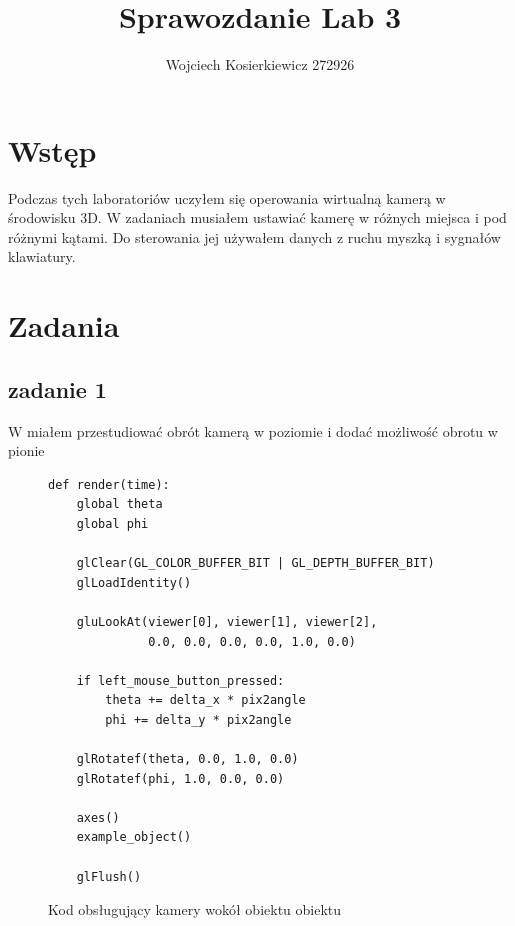 \documentclass[]{article}
\title{Sprawozdanie Lab 3}
\author{Wojciech Kosierkiewicz 272926}
\begin{document}
	\maketitle
	\newpage
	
\section{Wstęp}
Podczas tych laboratoriów uczyłem się operowania wirtualną kamerą w środowisku 3D. W zadaniach musiałem ustawiać kamerę w różnych miejsca i pod różnymi kątami. Do sterowania jej używałem danych z ruchu myszką i sygnałów klawiatury.
\section{Zadania}
\subsection{zadanie 1}
W miałem przestudiować obrót kamerą w poziomie i dodać możliwość obrotu w pionie
\begin{figure}[H]
	\begin{verbatim}
def render(time):
    global theta
    global phi

    glClear(GL_COLOR_BUFFER_BIT | GL_DEPTH_BUFFER_BIT)
    glLoadIdentity()

    gluLookAt(viewer[0], viewer[1], viewer[2],
              0.0, 0.0, 0.0, 0.0, 1.0, 0.0)

    if left_mouse_button_pressed:
        theta += delta_x * pix2angle
        phi += delta_y * pix2angle

    glRotatef(theta, 0.0, 1.0, 0.0)
    glRotatef(phi, 1.0, 0.0, 0.0)

    axes()
    example_object()

    glFlush()
\end{verbatim}
\caption{Kod obsługujący kamery wokół obiektu obiektu}
\end{figure}
\end{document}
